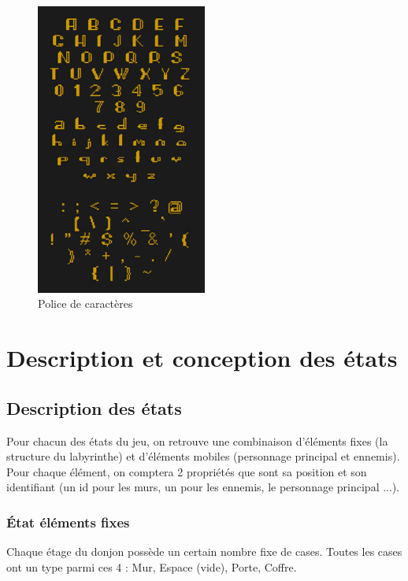 \documentclass[a4paper,12pt]{article}
\begin{document}
\begin{figure}[h]
\begin{center}
\includegraphics[width=0.5\textwidth]{font.png}
\caption{\label{font}Police de caractères}
\end{center}
\end{figure}

\clearpage
\section{Description et conception des états}

\subsection{Description des états}

Pour chacun des états du jeu, on retrouve une combinaison d'éléments fixes (la structure du labyrinthe) et d'éléments mobiles (personnage principal et ennemis).
Pour chaque élément, on comptera 2 propriétés que sont sa position et son identifiant (un id pour les murs, un pour les ennemis, le personnage principal ...).

\subsubsection{État éléments fixes}

Chaque étage du donjon possède un certain nombre fixe de cases. Toutes les cases ont un type parmi ces 4 : Mur, Espace (vide), Porte, Coffre.
\end{document}
